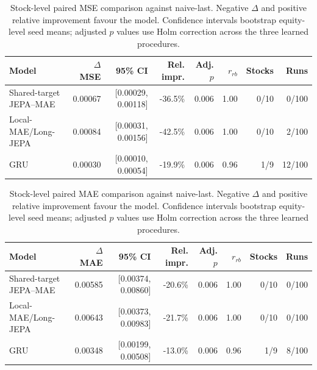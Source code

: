 \begin{table}[t]
\centering
\small
\caption{Stock-level paired MSE comparison against naive-last. Negative $\Delta$ and positive relative improvement favour the model. Confidence intervals bootstrap equity-level seed means; adjusted $p$ values use Holm correction across the three learned procedures.}
\label{tab:paired_mse_naive}
\begin{tabular}{lrrrrrrr}
\toprule
Model & $\Delta$MSE & 95\% CI & Rel. impr. & Adj. $p$ & $r_{rb}$ & Stocks & Runs \\
\midrule
Shared-target JEPA--MAE & 0.00067 & [0.00029, 0.00118] & -36.5\% & 0.006 & 1.00 & 0/10 & 0/100 \\
Local-MAE/Long-JEPA & 0.00084 & [0.00031, 0.00156] & -42.5\% & 0.006 & 1.00 & 0/10 & 2/100 \\
GRU & 0.00030 & [0.00010, 0.00054] & -19.9\% & 0.006 & 0.96 & 1/9 & 12/100 \\
\bottomrule
\end{tabular}
\end{table}

\begin{table}[t]
\centering
\small
\caption{Stock-level paired MAE comparison against naive-last. Negative $\Delta$ and positive relative improvement favour the model. Confidence intervals bootstrap equity-level seed means; adjusted $p$ values use Holm correction across the three learned procedures.}
\label{tab:paired_mae_naive}
\begin{tabular}{lrrrrrrr}
\toprule
Model & $\Delta$MAE & 95\% CI & Rel. impr. & Adj. $p$ & $r_{rb}$ & Stocks & Runs \\
\midrule
Shared-target JEPA--MAE & 0.00585 & [0.00374, 0.00860] & -20.6\% & 0.006 & 1.00 & 0/10 & 0/100 \\
Local-MAE/Long-JEPA & 0.00643 & [0.00373, 0.00983] & -21.7\% & 0.006 & 1.00 & 0/10 & 0/100 \\
GRU & 0.00348 & [0.00199, 0.00508] & -13.0\% & 0.006 & 0.96 & 1/9 & 8/100 \\
\bottomrule
\end{tabular}
\end{table}
